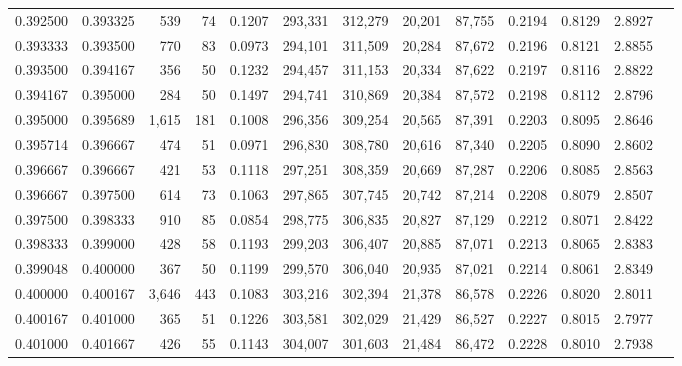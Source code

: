 \begin{tabular}{rrrrrrrrrrrrr}
0.392500 & 0.393325 &   539 &  74 &                                     0.1207 & 293,331 & 312,279 &  20,201 &  87,755 & 0.2194 & 0.8129 & 2.8927 \\
0.393333 & 0.393500 &   770 &  83 &                                     0.0973 & 294,101 & 311,509 &  20,284 &  87,672 & 0.2196 & 0.8121 & 2.8855 \\
0.393500 & 0.394167 &   356 &  50 &                                     0.1232 & 294,457 & 311,153 &  20,334 &  87,622 & 0.2197 & 0.8116 & 2.8822 \\
0.394167 & 0.395000 &   284 &  50 &                                     0.1497 & 294,741 & 310,869 &  20,384 &  87,572 & 0.2198 & 0.8112 & 2.8796 \\
0.395000 & 0.395689 & 1,615 & 181 &                                     0.1008 & 296,356 & 309,254 &  20,565 &  87,391 & 0.2203 & 0.8095 & 2.8646 \\
0.395714 & 0.396667 &   474 &  51 &                                     0.0971 & 296,830 & 308,780 &  20,616 &  87,340 & 0.2205 & 0.8090 & 2.8602 \\
0.396667 & 0.396667 &   421 &  53 &                                     0.1118 & 297,251 & 308,359 &  20,669 &  87,287 & 0.2206 & 0.8085 & 2.8563 \\
0.396667 & 0.397500 &   614 &  73 &                                     0.1063 & 297,865 & 307,745 &  20,742 &  87,214 & 0.2208 & 0.8079 & 2.8507 \\
0.397500 & 0.398333 &   910 &  85 &                                     0.0854 & 298,775 & 306,835 &  20,827 &  87,129 & 0.2212 & 0.8071 & 2.8422 \\
0.398333 & 0.399000 &   428 &  58 &                                     0.1193 & 299,203 & 306,407 &  20,885 &  87,071 & 0.2213 & 0.8065 & 2.8383 \\
0.399048 & 0.400000 &   367 &  50 &                                     0.1199 & 299,570 & 306,040 &  20,935 &  87,021 & 0.2214 & 0.8061 & 2.8349 \\
0.400000 & 0.400167 & 3,646 & 443 &                                     0.1083 & 303,216 & 302,394 &  21,378 &  86,578 & 0.2226 & 0.8020 & 2.8011 \\
0.400167 & 0.401000 &   365 &  51 &                                     0.1226 & 303,581 & 302,029 &  21,429 &  86,527 & 0.2227 & 0.8015 & 2.7977 \\
0.401000 & 0.401667 &   426 &  55 &                                     0.1143 & 304,007 & 301,603 &  21,484 &  86,472 & 0.2228 & 0.8010 & 2.7938 \\

\end{tabular}
